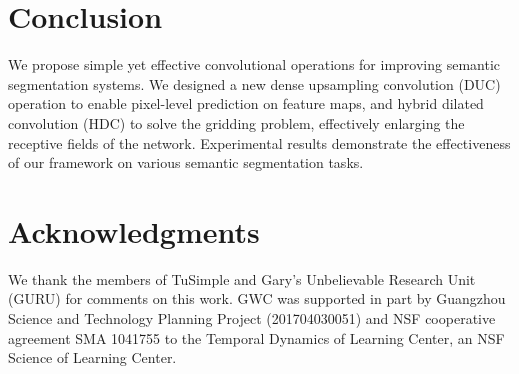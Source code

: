 \documentclass[10pt,twocolumn,letterpaper]{article}
\begin{document}
\section{Conclusion}
We propose simple yet effective convolutional operations for improving semantic segmentation systems. We designed a new dense upsampling convolution (DUC) operation to enable pixel-level prediction on feature maps, and hybrid dilated convolution (HDC) to solve the gridding problem, effectively enlarging the receptive fields of the network. Experimental results demonstrate the effectiveness of our framework on various semantic segmentation tasks.

\section{Acknowledgments}
We thank the members of TuSimple and Gary's Unbelievable Research Unit (GURU) for comments on this work. GWC was supported in part by Guangzhou Science and Technology Planning Project (201704030051) and NSF cooperative agreement SMA 1041755 to the Temporal Dynamics of Learning Center, an NSF Science of Learning Center.


{\small


}
\end{document}

